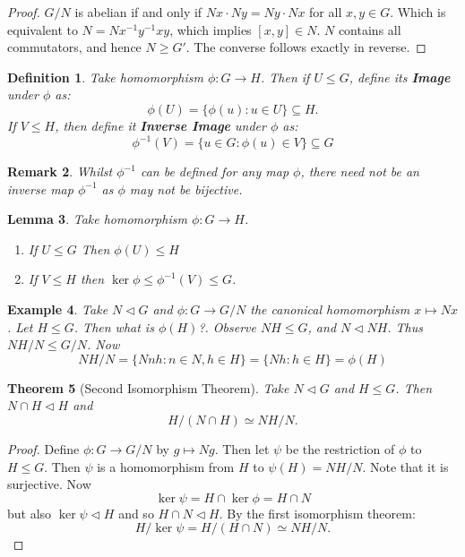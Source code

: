 \documentclass[a4paper,10pt]{article}
\newtheorem{thm}{Theorem}
\newtheorem{Def}[thm]{Definition}
\newtheorem{eg}[thm]{Example}
\newtheorem{Lem}[thm]{Lemma}
\newtheorem{rem}[thm]{Remark}
\begin{document}
\begin{proof}
$G/N$ is abelian if and only if $Nx \cdot Ny = Ny \cdot Nx$ for all $x,y \in G$. Which is equivalent to $N = Nx^{-1}y^{-1}xy$, which implies $[x,y] \in N$. $N$ contains all commutators, and hence $N \geq G'$. The converse follows exactly in reverse.
\end{proof}
\begin{Def}
Take homomorphism $\phi : G \rightarrow H$. Then if $U \leq G$, define its \textbf{Image} under $\phi$ as:
\[ \phi(U) = \{ \phi(u) : u \in U \} \subseteq H.\]
If $V \leq H$, then define it \textbf{Inverse Image} under $\phi$ as:
\[ \phi^{-1} (V) = \{ u \in G : \phi(u) \in V \} \subseteq G\]
\end{Def}

\begin{rem}
Whilst $\phi^{-1}$ can be defined for any map $\phi$, there need not be an inverse map $\phi^{-1}$ as $\phi$ may not be bijective.
\end{rem}

\begin{Lem}
Take homomorphism $\phi : G \rightarrow H$.
\begin{enumerate}
\item  If $U \leq G$ Then $\phi(U) \leq H$
\item If $V \leq H$ then $\ker \phi \leq \phi^{-1}(V) \leq G$. 
\end{enumerate}

\end{Lem}

\begin{eg}
Take $N \triangleleft G$ and $\phi: G \rightarrow G / N$ the canonical homomorphism $x \mapsto Nx$. Let $H \leq G$. Then what is $\phi(H)$?. Observe $NH \leq G$, and $N \triangleleft NH$. Thus $NH / N \leq G / N$. Now
\[ NH / N = \{ Nnh : n \in N, h \in H \} = \{ Nh : h \in H \} = \phi(H) \]
\end{eg}

\begin{thm}[Second Isomorphism Theorem]
Take $N \triangleleft G$ and $H \leq G$. Then $N \cap H \triangleleft H$ and 
\[ H / (N \cap H) \simeq NH / N. \]
\end{thm}

\begin{proof}
Define $\phi : G \rightarrow G / N$ by $g \mapsto Ng$. Then let $\psi$ be the restriction of $\phi$ to $H \leq G$. Then $\psi$ is a homomorphism from $H$ to $\psi(H) = NH / N$. Note that it is surjective. Now 
\[ \ker \psi = H \cap \ker \phi = H \cap N \]
but also $\ker \psi \triangleleft H$ and so $H \cap N \triangleleft H$. By the first isomorphism theorem:
\[ H / \ker \psi = H / (H \cap N) \simeq NH / N. \]
\end{proof}
\end{document}
